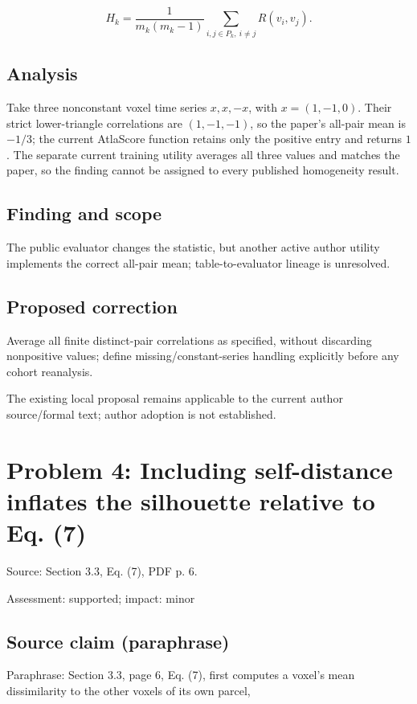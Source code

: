 \documentclass[11pt]{article}
\begin{document}
\[H_k=\frac{1}{m_k(m_k-1)}\sum_{i,j\in P_k,\ i\ne j}R(v_i,v_j). \]

\subsection*{Analysis}

Take three nonconstant voxel time series \(x,x,-x\), with \(x=(1,-1,0)\). Their strict lower-triangle correlations are \((1,-1,-1)\), so the paper’s all-pair mean is \(-1/3\); the current AtlaScore function retains only the positive entry and returns \(1\). The separate current training utility averages all three values and matches the paper, so the finding cannot be assigned to every published homogeneity result.

\subsection*{Finding and scope}

The public evaluator changes the statistic, but another active author utility implements the correct all-pair mean; table-to-evaluator lineage is unresolved.

\subsection*{Proposed correction}

Average all finite distinct-pair correlations as specified, without discarding nonpositive values; define missing/constant-series handling explicitly before any cohort reanalysis.

The existing local proposal remains applicable to the current author source/formal text; author adoption is not established.

\section*{Problem 4: Including self-distance inflates the silhouette relative to Eq. (7)}

Source: Section 3.3, Eq. (7), PDF p. 6.

Assessment: supported; impact: minor

\subsection*{Source claim (paraphrase)}

Paraphrase: Section 3.3, page 6, Eq. (7), first computes a voxel’s mean dissimilarity to the other voxels of its own parcel,
\end{document}
